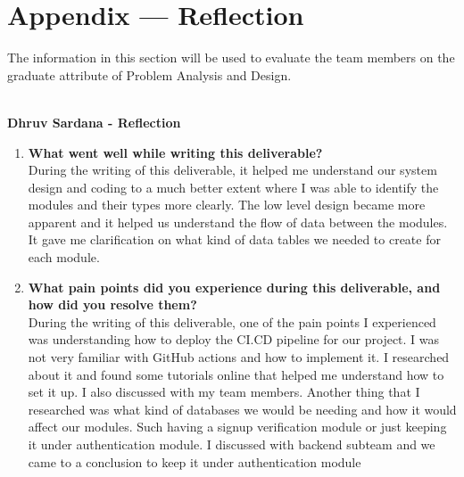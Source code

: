 \documentclass[12pt, titlepage]{article}
\begin{document}
\section*{Appendix --- Reflection}


The information in this section will be used to evaluate the team members on the
graduate attribute of Problem Analysis and Design.

 \\

\textbf{Dhruv Sardana - Reflection}
\begin{enumerate}
  \item \textbf{What went well while writing this deliverable?} \\
  During the writing of this deliverable, it helped me understand our system design 
  and coding to a much better extent where I was able to identify the modules and 
  their types more clearly. The low level design became more apparent and it helped us 
  understand the flow of data between the modules. It gave me clarification on what kind 
  of data tables we needed to create for each module.
  

  \item \textbf{What pain points did you experience during this deliverable, and how
    did you resolve them?} \\
    During the writing of this deliverable, one of the pain points I experienced was understanding how to 
    deploy the CI.CD pipeline for our project. I was not very familiar with GitHub actions and how to implement it.
    I researched about it and found some tutorials online that helped me understand how to set it up. 
    I also discussed with my team members. Another thing that I researched was what kind of databases we would
    be needing and how it would affect our modules. Such having a signup verification module or just keeping
    it under authentication module. I discussed with backend subteam and we came to a conclusion to keep it under 
    authentication module 
  
\end{enumerate}
\end{document}
